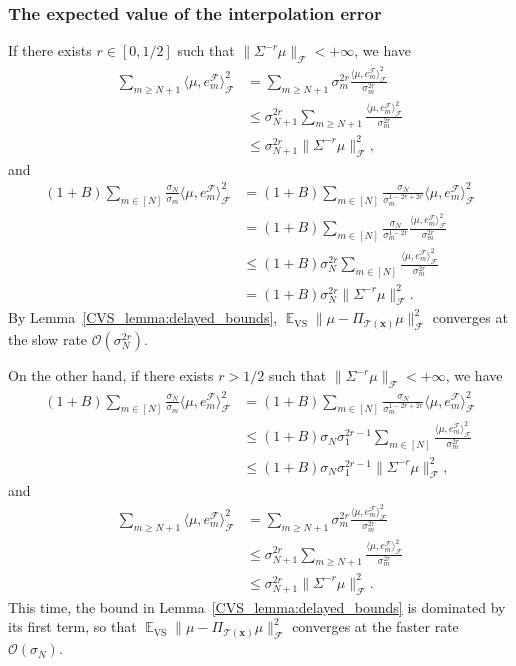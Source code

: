 \documentclass[twoside,11pt]{book}
\numberwithin{theorem}{chapter}
\numberwithin{definition}{chapter}
\numberwithin{proposition}{chapter}
\numberwithin{corollary}{chapter}
\numberwithin{example}{chapter}
\numberwithin{lemma}{chapter}
\numberwithin{assumption}{chapter}
\DeclareMathOperator{\VS}{\mathrm{VS}}
\DeclareMathOperator{\EX}{\mathbb{E}}
\DeclareMathOperator{\F}{\mathcal{F}}
\begin{document}
\subsubsection{The expected value of the interpolation error}
If there exists $r \in [0,1/2]$ such that $\displaystyle \| \Sigma^{-r} \mu \|_{\F} < +\infty$, we have
\begin{align}
\sum\limits_{m \geq N+1} \langle \mu,e_{m}^{\F} \rangle_{\F}^{2}
& = \sum\limits_{m \geq N+1} \sigma_{m}^{2r} \frac{ \langle \mu,e_{m}^{\F} \rangle_{\F}^{2}}{\sigma_{m}^{2r}} \\
& \leq \sigma_{N+1}^{2r} \sum\limits_{m \geq N+1} \frac{ \langle \mu,e_{m}^{\F} \rangle_{\F}^{2}}{\sigma_{m}^{2r}} \\
& \leq \sigma_{N+1}^{2r} \|\Sigma^{-r} \mu\|_{\F}^{2},
\end{align}
and
\begin{align}
(1+B) \sum\limits_{m \in [N]} \frac{\sigma_{N}}{\sigma_{m}} \langle \mu,e_{m}^{\F} \rangle_{\F}^{2}
& = (1+B) \sum\limits_{m \in [N]} \frac{\sigma_{N}}{\sigma_{m}^{1-2r+2r}} \langle \mu,e_{m}^{\F} \rangle_{\F}^{2} \\
& = (1+B) \sum\limits_{m \in [N]} \frac{\sigma_{N}}{\sigma_{m}^{1-2r}} \frac{\langle \mu,e_{m}^{\F} \rangle_{\F}^{2}}{\sigma_{m}^{2r}} \\
& \leq (1+B) \sigma_{N}^{2r} \sum\limits_{m \in [N]} \frac{\langle \mu,e_{m}^{\F} \rangle_{\F}^{2}}{\sigma_{m}^{2r}} \\
& = (1+B) \sigma_{N}^{2r} \|\Sigma^{-r} \mu\|_{\F}^{2}.
\end{align}
By Lemma~\ref{CVS_lemma:delayed_bounds}, $\displaystyle \EX_{\VS}\| \mu - \Pi_{\mathcal{T}(\bm{x})} \mu \|_{\F}^{2}$ converges at the slow rate $\mathcal{O}(\sigma_{N}^{2r})$.

On the other hand, if there exists $r > 1/2$ such that $\displaystyle \| \Sigma^{-r} \mu \|_{\F} < +\infty$, we have
\begin{align}
(1+B) \sum\limits_{m \in [N]} \frac{\sigma_{N}}{\sigma_{m}} \langle \mu,e_{m}^{\F} \rangle_{\F}^{2}
& = (1+B) \sum\limits_{m \in [N]} \frac{\sigma_{N}}{\sigma_{m}^{1-2r+2r}} \langle \mu,e_{m}^{\F} \rangle_{\F}^{2} \\
& \leq (1+B) \sigma_{N} \sigma_{1}^{2r-1} \sum\limits_{m \in [N]} \frac{\langle \mu,e_{m}^{\F} \rangle_{\F}^{2}}{\sigma_{m}^{2r}} \\
&  \leq (1+B) \sigma_{N} \sigma_{1}^{2r-1} \|\Sigma^{-r} \mu\|_{\F}^{2},
\end{align}
and
\begin{align}
\sum\limits_{m \geq N+1} \langle \mu,e_{m}^{\F} \rangle_{\F}^{2}
& = \sum\limits_{m \geq N+1} \sigma_{m}^{2r} \frac{ \langle \mu,e_{m}^{\F} \rangle_{\F}^{2}}{\sigma_{m}^{2r}} \\
& \leq \sigma_{N+1}^{2r} \sum\limits_{m \geq N+1} \frac{ \langle \mu,e_{m}^{\F} \rangle_{\F}^{2}}{\sigma_{m}^{2r}} \\
& \leq \sigma_{N+1}^{2r} \|\Sigma^{-r} \mu\|_{\F}^{2}.
\end{align}
This time, the bound in Lemma~\ref{CVS_lemma:delayed_bounds} is dominated by its first term, so that $\displaystyle \EX_{\VS}\| \mu - \Pi_{\mathcal{T}(\bm{x})} \mu \|_{\F}^{2}$ converges at the faster rate $\mathcal{O}(\sigma_{N})$.
\end{document}
